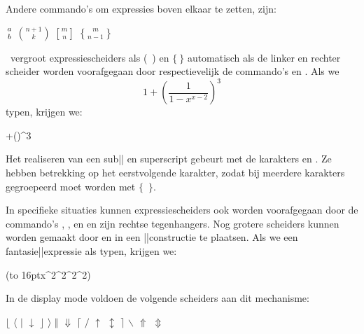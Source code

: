 Andere commando's om expressies boven elkaar te zetten,
zijn:

\startbuffer[atop]
${a} \atop {b}$
\stopbuffer
\startbuffer[choose]
${n+1} \choose {k}$
\stopbuffer
\startbuffer[brack]
${m} \brack {n}$
\stopbuffer
\startbuffer[brace]
${m} \brace {n-1}$
\stopbuffer

\starttabulatie[|l|l|l|l|]
\NC \type {\atop}
\NC \typebuffer[atop]
\NC \mathstrut\haalbuffer[atop]
\NC
\NC\NR
\NC \type {\choose}
\NC \typebuffer[choose]
\NC
\NC \mathstrut\haalbuffer[choose]
\NC\NR
\NC \type {\brack}
\NC \typebuffer[brack]
\NC \mathstrut\haalbuffer[brack]
\NC
\NC\NR
\NC \type {\brace}
\NC \typebuffer[brace]
\NC
\NC \mathstrut\haalbuffer[brace]
\NC\NR
\stoptabulatie

\TEX\ vergroot expressiescheiders als (~) en $\{~\}$
automatisch als de linker en rechter scheider worden
voorafgegaan door respectievelijk de commando's \type
{\left} en \type {\right}. Als we \type
{$$1+\left(\frac{1}{1-x^{x-2}}\right)^3$$} typen, krijgen
we:

+\left(\right)^3
\stopformule

Het realiseren van een sub|| en superscript gebeurt met de
karakters \citeer{\type{_}} en \citeer{\type{^}}. Ze hebben
betrekking op het eerstvolgende karakter, zodat bij meerdere
karakters gegroepeerd moet worden met $\{$~$\}$.

In specifieke situaties kunnen expressiescheiders ook worden
voorafgegaan door de commando's \type{\bigl}, \type{\Bigl},
\type{\biggl} en \type{\Biggl} en zijn rechtse tegenhangers.
Nog grotere scheiders kunnen worden gemaakt door
\type{\left} en \type{\right} in een
\type{\vbox}||constructie te plaatsen. Als we een
fantasie||expressie als  typen, krijgen we:

\startformule
\left(\vbox to 16pt{}x^{2^{2^{2^{2}}}}\right)
\stopformule

In de display mode voldoen de volgende scheiders aan
dit mechanisme:

\starttabulatie[|l|l|l|l|l|l|l|l|]
\NC \type{\lfloor}      \NC $\lfloor$
\NC \type{\langle}      \NC $\langle$
\NC \type{\vert}        \NC $\vert$
\NC \type{\downarrow}   \NC $\downarrow$
\NC\NR
\NC \type{\rfloor}      \NC $\rfloor$
\NC \type{\rangle}      \NC $\rangle$
\NC \type{\Vert}        \NC $\Vert$
\NC \type{\Downarrow}   \NC $\Downarrow$
\NC\NR
\NC \type{\lceil}       \NC $\lceil$
\NC \type{/}            \NC $/$
\NC \type{\uparrow}     \NC $\uparrow$
\NC \type{\updownarrow} \NC $\updownarrow$
\NC\NR
\NC \type{\rceil}       \NC $\rceil$
\NC \type{\backslash}   \NC $\backslash$
\NC \type{\Uparrow}     \NC $\Uparrow$
\NC \type{\Updownarrow} \NC $\Updownarrow$
\NC\NR
\stoptabulatie

